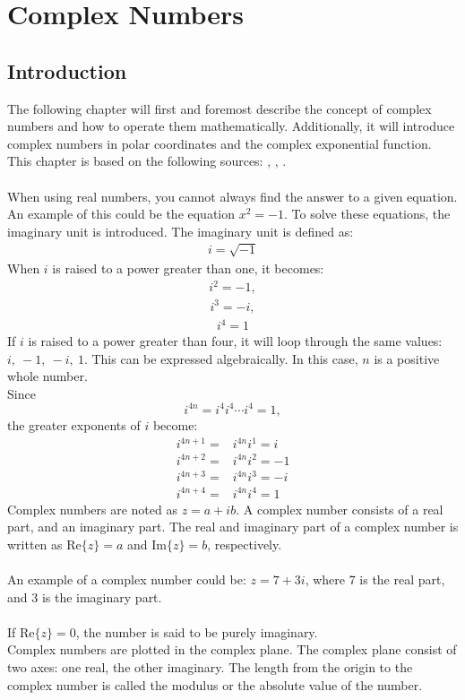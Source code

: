 \chapter{Complex Numbers}

\section{Introduction}
The following chapter will first and foremost describe the concept of complex numbers and how to operate them mathematically. Additionally, it will introduce complex numbers in polar coordinates and the complex exponential function.
\\
This chapter is based on the following sources: \cite{complexpaul}, \cite{complexpurple}, \cite{complexnotebook}.
\\
\\
When using real numbers, you cannot always find the answer to a given equation. An example of this could be the equation $x^2=-1$. To solve these equations, the imaginary unit is introduced. The imaginary unit is defined as:
\begin{align*}
i=\sqrt{-1}
\end{align*}
When $i$ is raised to a power greater than one, it becomes:
\begin{align*}
i^2=-1,
\end{align*}
\begin{align*}
i^3=-i,
\end{align*}
\begin{align*}
i^4=1
\end{align*}
If $i$ is raised to a power greater than four, it will loop through the same values: $i, \ -1, \ -i, \ 1$. This can be expressed algebraically. In this case, $n$ is a  positive whole number. 
\\
Since $$i^{4n} = i^4i^4\cdots i^4 = 1,$$
the greater exponents of $i$ become:
\begin{align*}
	i^{4n+1} =& i^{4n}i^1 = i \\
	i^{4n+2} =& i^{4n}i^2 = -1 \\
	i^{4n+3} =& i^{4n}i^3 = -i \\
	i^{4n+4} =& i^{4n}i^4 = 1
\end{align*}
Complex numbers are noted as $z = a+ib$. A complex number consists of a real part, and an imaginary part. The real and imaginary part of a complex number is written as $\text{Re}\{z\}=a$ and $\text{Im}\{z\}=b$, respectively.
\\
\\
An example of a complex number could be: $z=7+3i$, where 7 is the real part, and 3 is the imaginary part. 
\\
\\
If $\text{Re}\{z\}=0$, the number is said to be purely imaginary.  
\\
Complex numbers are plotted in the complex plane. The complex plane consist of two axes: one real, the other imaginary.
The length from the origin to the complex number is called the modulus or the absolute value of the number.

